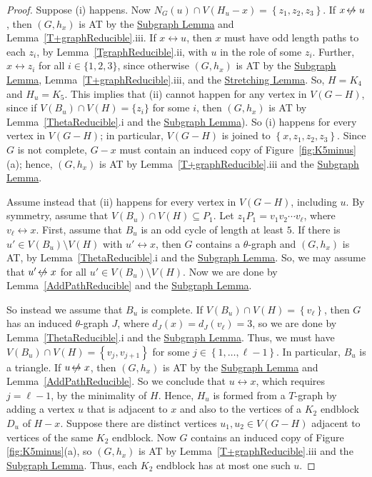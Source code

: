 \documentclass[12pt]{article}
\theoremstyle{plain}
\theoremstyle{definition}
\theoremstyle{remark}
\newcommand{\set}[1]{\left\{ #1 \right\}}
\newcommand{\irange}[1]{\left\{1,\ldots,#1\right\}}
\def\adj{\leftrightarrow}
\def\nonadj{\not\!\leftrightarrow}
\begin{document}
\begin{proof}
		Suppose (i) happens. Now $N_G(u) \cap V(H_u - x) = \set{z_1,z_2,z_3}$. If $x
		\nonadj u$, then $(G,h_x)$ is AT by the \hyperlink{target:InducedSubgraph}{Subgraph Lemma} and Lemma~\ref{T+graphReducible}.iii.  If $x \adj u$, then $x$ must have odd
		length paths to each $z_i$, by Lemma~\ref{TgraphReducible}.ii, with $u$ in the role
		of some $z_i$.  Further, $x \adj z_i$ for all $i \in \{1,2,3\}$, since
		otherwise $(G,h_x)$ is AT by the \hyperlink{target:InducedSubgraph}{Subgraph Lemma},
		Lemma~\ref{T+graphReducible}.iii, and the \hyperlink{target:SubdivideTwice}{Stretching Lemma}.  So, $H=K_4$ and $H_u=K_5$.  This implies that (ii) cannot happen for
		any vertex in $V(G-H)$, since if $V(B_u)\cap V(H)=\{z_i\}$ for some $i$, then
		$(G,h_x)$ is AT by Lemma~\ref{ThetaReducible}.i
		and the \hyperlink{target:InducedSubgraph}{Subgraph Lemma}).
		So (i) happens for every vertex in $V(G-H)$; in particular, $V(G-H)$ is joined
		to $\set{x,z_1,z_2,z_3}$.  Since $G$ is not complete, $G-x$ must contain an induced
		copy of Figure~\ref{fig:K5minus}(a); hence, $(G,h_x)$ is AT by
		Lemma~\ref{T+graphReducible}.iii and the \hyperlink{target:InducedSubgraph}{Subgraph Lemma}.
		
		Assume instead that (ii) happens for every vertex in $V(G-H)$, including $u$. 
		By symmetry, assume that $V(B_u) \cap V(H) \subseteq P_1$.  Let $z_1P_1
		= v_1v_2\cdots v_{\ell}$, where $v_{\ell}\adj x$.  First, assume that $B_u$ is
		an odd cycle of length at least $5$.  If there is $u' \in V(B_u)\setminus V(H)$
		with $u' \adj x$, then $G$ contains a $\theta$-graph and  $(G,h_x)$ is AT, by
		Lemma~\ref{ThetaReducible}.i and the \hyperlink{target:InducedSubgraph}{Subgraph Lemma}.  So, we may assume that $u' \nonadj x$ for all $u' \in V(B_u)\setminus
		V(H)$.  Now we are done by Lemma~\ref{AddPathReducible} and the
		\hyperlink{target:InducedSubgraph}{Subgraph Lemma}.
		
		So instead we assume that $B_u$ is complete. If $V(B_u) \cap V(H)=\set{v_\ell}$,
		then $G$ has an induced $\theta$-graph $J$, where $d_J(x)=d_J(v_\ell)=3$, so we are
		done by Lemma~\ref{ThetaReducible}.i and the \hyperlink{target:InducedSubgraph}{Subgraph Lemma}.  Thus, we must have $V(B_u) \cap V(H) = \set{v_{j}, v_{j+1}}$ for some
		$j \in \irange{\ell-1}$.  In particular, $B_u$ is a triangle.  If $u\nonadj x$,
		then $(G,h_x)$ is AT by the \hyperlink{target:InducedSubgraph}{Subgraph Lemma} and
		Lemma~\ref{AddPathReducible}.  So we conclude that $u\adj x$, which requires
		$j=\ell-1$, by the minimality of $H$.  Hence, $H_u$ is formed from a $T$-graph
		by adding a vertex $u$ that is adjacent to $x$ and also to the vertices of a
		$K_2$ endblock $D_u$ of $H-x$. 
		Suppose there are distinct vertices $u_1, u_2\in V(G-H)$ 
		adjacent to vertices of the same $K_2$ endblock.
		Now $G$ contains an induced copy of Figure \ref{fig:K5minus}(a), so 
		$(G,h_x)$ is AT by Lemma~\ref{T+graphReducible}.iii and the
		\hyperlink{target:InducedSubgraph}{Subgraph Lemma}.  Thus, each $K_2$ endblock has at
		most one such $u$.  
		

\end{proof}
\end{document}

